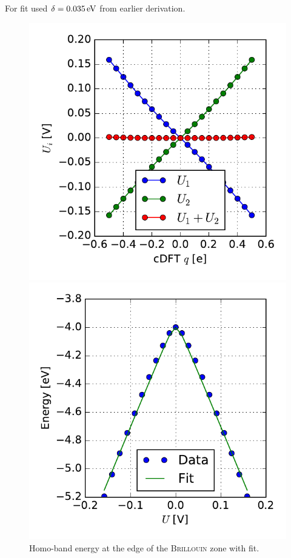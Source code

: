 For fit used $\delta = \unit[0.035]{eV}$ from earlier derivation.
\begin{figure}
	\centering
	\begin{minipage}{0.45\textwidth}
	\includegraphics[width = \textwidth]{Images/polyacetylene/charging/potential_q_1}
	\caption{}
	\label{}
	\end{minipage}
	\begin{minipage}{.45\textwidth}
	\includegraphics[width = \textwidth]{Images/polyacetylene/charging/border_energy_q_1}
	\caption{Homo-band energy at the edge of the \textsc{Brillouin} zone with fit.}
	\label{}
	\end{minipage}
\end{figure}
